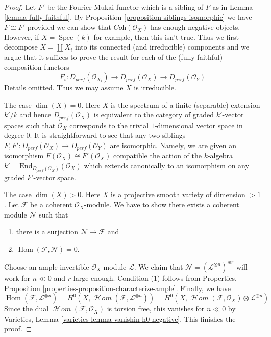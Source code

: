 \documentclass[10pt,a4paper]{amsart}
\theoremstyle{plain}
\theoremstyle{definition}
\theoremstyle{remark}
\numberwithin{equation}{subsection}
\def\Spec{\mathop{\mathrm{Spec}}}
\def\Hom{\mathop{\mathrm{Hom}}\nolimits}
\def\SheafHom{\mathop{\mathcal{H}\!\mathit{om}}\nolimits}
\begin{document}
\begin{proof}
Let $F'$ be the Fourier-Mukai functor which is a sibling of $F$
as in Lemma \ref{lemma-fully-faithful}.
By Proposition \ref{proposition-siblings-isomorphic} we have $F \cong F'$
provided we can show that $\textit{Coh}(\mathcal{O}_X)$ has enough
negative objects. However, if $X = \Spec(k)$ for example, then
this isn't true. Thus we first decompose $X = \coprod X_i$
into its connected (and irreducible) components and we
argue that it suffices to prove the result for each of the
(fully faithful) composition functors
$$
F_i :
D_{perf}(\mathcal{O}_{X_i}) \to
D_{perf}(\mathcal{O}_X) \to
D_{perf}(\mathcal{O}_Y)
$$
Details omitted. Thus we may assume $X$ is irreducible.

\medskip\noindent
The case $\dim(X) = 0$. Here $X$ is the spectrum of a finite (separable)
extension $k'/k$ and hence $D_{perf}(\mathcal{O}_X)$
is equivalent to the category
of graded $k'$-vector spaces such that $\mathcal{O}_X$ corresponds to the
trivial $1$-dimensional vector space in degree $0$.
It is straightforward to see that any two
siblings $F, F' : D_{perf}(\mathcal{O}_X) \to D_{perf}(\mathcal{O}_Y)$
are isomorphic. Namely, we are given an isomorphism
$F(\mathcal{O}_X) \cong F'(\mathcal{O}_X)$
compatible the action of the $k$-algebra
$k' = \text{End}_{D_{perf}(\mathcal{O}_X)}(\mathcal{O}_X)$
which extends canonically to an isomorphism on any graded $k'$-vector space.

\medskip\noindent
The case $\dim(X) > 0$. Here $X$ is a projective smooth
variety of dimension $> 1$. Let $\mathcal{F}$ be a coherent
$\mathcal{O}_X$-module. We have to show there exists a
coherent module $\mathcal{N}$ such that
\begin{enumerate}
\item there is a surjection $\mathcal{N} \to \mathcal{F}$ and
\item $\Hom(\mathcal{F}, \mathcal{N}) = 0$.
\end{enumerate}
Choose an ample invertible $\mathcal{O}_X$-module $\mathcal{L}$.
We claim that $\mathcal{N} = (\mathcal{L}^{\otimes n})^{\oplus r}$
will work for $n \ll 0$ and $r$ large enough.
Condition (1) follows from
Properties, Proposition \ref{properties-proposition-characterize-ample}.
Finally, we have
$$
\Hom(\mathcal{F}, \mathcal{L}^{\otimes n}) =
H^0(X, \SheafHom(\mathcal{F}, \mathcal{L}^{\otimes n})) =
H^0(X, \SheafHom(\mathcal{F}, \mathcal{O}_X) \otimes \mathcal{L}^{\otimes n})
$$
Since the dual $\SheafHom(\mathcal{F}, \mathcal{O}_X)$ is torsion free, this
vanishes for $n \ll 0$ by Varieties, Lemma 
\ref{varieties-lemma-vanishin-h0-negative}. This finishes the proof.
\end{proof}
\end{document}
